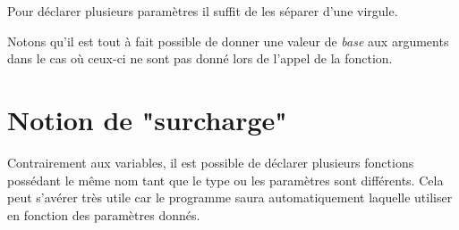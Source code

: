

Pour déclarer plusieurs paramètres il suffit de les séparer d'une virgule.



Notons qu'il est tout à fait possible de donner une valeur de \emph{base} aux arguments dans le cas où ceux-ci ne sont pas donné lors de l'appel de la fonction.



\section{Notion de "surcharge"}
Contrairement aux variables, il est possible de déclarer plusieurs fonctions possédant le même nom tant que le type ou les paramètres sont différents. Cela peut s'avérer très utile car le programme saura automatiquement laquelle utiliser en fonction des paramètres donnés.

